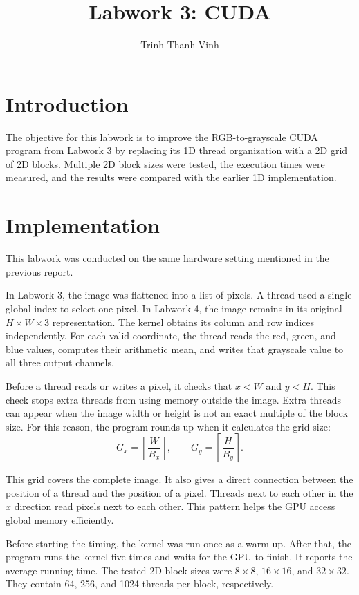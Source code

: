 \documentclass{report}
\author{Trinh Thanh Vinh}
\title{Labwork 3: CUDA}
\begin{document}
\maketitle

\section{Introduction}
The objective for this labwork is to improve the RGB-to-grayscale CUDA program from Labwork 3 by replacing its 1D thread organization with a 2D grid of 2D blocks. Multiple 2D block sizes were tested, the execution times were measured, and the results were compared with the earlier 1D implementation.

\section{Implementation}
This labwork was conducted on the same hardware setting mentioned in the previous report.

In Labwork 3, the image was flattened into a list of pixels. A thread used a single global index to select one pixel. In Labwork 4, the image remains in its original $H\times W\times 3$ representation. The kernel obtains its column and row indices independently. For each valid coordinate, the thread reads the red, green, and blue values, computes their arithmetic mean, and writes that grayscale value to all three output channels.

Before a thread reads or writes a pixel, it checks that $x < W$ and $y < H$. This check stops extra threads from using memory outside the image. Extra threads can appear when the image width or height is not an exact multiple of the block size. For this reason, the program rounds up when it calculates the grid size:
\[
  G_x = \left\lceil\frac{W}{B_x}\right\rceil, \qquad
  G_y = \left\lceil\frac{H}{B_y}\right\rceil.
\]

This grid covers the complete image. It also gives a direct connection between the position of a thread and the position of a pixel. Threads next to each other in the $x$ direction read pixels next to each other. This pattern helps the GPU access global memory efficiently.

Before starting the timing, the kernel was run once as a warm-up. After that, the program runs the kernel five times and waits for the GPU to finish. It reports the average running time. The tested 2D block sizes were $8\times8$, $16\times16$, and $32\times32$. They contain 64, 256, and 1024 threads per block, respectively.
\end{document}
